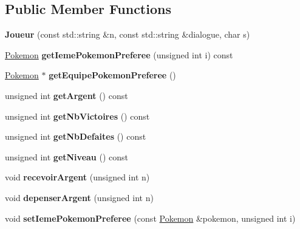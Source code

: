 \subsection*{Public Member Functions}
\begin{DoxyCompactItemize}
\item 
\mbox{\label{class_joueur_ad5a62f0c8a5840471d23beb966762822}} 
{\bfseries Joueur} (const std\+::string \&n, const std\+::string \&dialogue, char s)
\item 
\mbox{\label{class_joueur_a075b7c96569b2f610291af06d3439275}} 
\hyperlink{class_pokemon}{Pokemon} {\bfseries get\+Ieme\+Pokemon\+Preferee} (unsigned int i) const
\item 
\mbox{\label{class_joueur_a88066ee4708f19c8bbc0052fd0b140b3}} 
\hyperlink{class_pokemon}{Pokemon} $\ast$ {\bfseries get\+Equipe\+Pokemon\+Preferee} ()
\item 
\mbox{\label{class_joueur_ae06420103fca19bb0dca8ba9ed261bd6}} 
unsigned int {\bfseries get\+Argent} () const
\item 
\mbox{\label{class_joueur_ae411355727ca5cd183183ba992693180}} 
unsigned int {\bfseries get\+Nb\+Victoires} () const
\item 
\mbox{\label{class_joueur_a82a78911f157c2fee8a7587064a4ce25}} 
unsigned int {\bfseries get\+Nb\+Defaites} () const
\item 
\mbox{\label{class_joueur_abec464c3958916f951e19ba5e12d0dbc}} 
unsigned int {\bfseries get\+Niveau} () const
\item 
\mbox{\label{class_joueur_a816878a126e2e8a4610f782b4a06f53f}} 
void {\bfseries recevoir\+Argent} (unsigned int n)
\item 
\mbox{\label{class_joueur_ae496646b2078c86011fa200b631168ca}} 
void {\bfseries depenser\+Argent} (unsigned int n)
\item 
\mbox{\label{class_joueur_a7757f9389d906cdc48e0e10b8cdc7548}} 
void {\bfseries set\+Ieme\+Pokemon\+Preferee} (const \hyperlink{class_pokemon}{Pokemon} \&pokemon, unsigned int i)

\end{DoxyCompactItemize}

